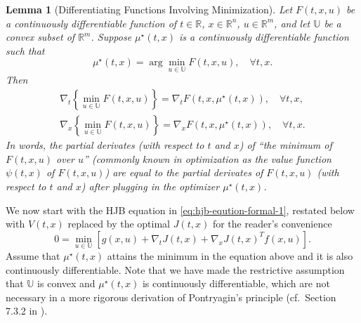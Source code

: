 \documentclass[
]{book}
\newtheorem{lemma}{Lemma}[chapter]
\theoremstyle{definition}
\theoremstyle{definition}
\theoremstyle{definition}
\theoremstyle{definition}
\theoremstyle{remark}
\begin{document}
\begin{lemma}[Differentiating Functions Involving Minimization]
\protect\hypertarget{lem:gradientofminimumfunctions}{}\label{lem:gradientofminimumfunctions}Let \(F(t,x,u)\) be a continuously differentiable function of \(t \in \mathbb{R}\), \(x \in \mathbb{R}^n\), \(u \in \mathbb{R}^m\), and let \(\mathbb{U}\) be a convex subset of \(\mathbb{R}^m\). Suppose \(\mu^\star(t,x)\) is a continuously differentiable function such that
\[
\mu^\star(t,x) = \arg\min_{u \in \mathbb{U}} F(t,x,u), \quad \forall t,x.
\]
Then
\begin{align}
\nabla_t \left\{ \min_{u \in \mathbb{U}} F(t,x,u) \right\} = \nabla_t F(t,x,\mu^\star(t,x)), \quad \forall t,x, \\
\nabla_x \left\{ \min_{u \in \mathbb{U}} F(t,x,u) \right\} = \nabla_x F(t,x,\mu^\star(t,x)), \quad \forall t,x.
\end{align}
In words, the partial derivates (with respect to \(t\) and \(x\)) of ``the minimum of \(F(t,x,u)\) over \(u\)'' (commonly known in optimization as the value function \(\psi(t,x)\) of \(F(t,x,u)\)) are equal to the partial derivates of \(F(t,x,u)\) (with respect to \(t\) and \(x\)) after plugging in the optimizer \(\mu^\star(t,x)\).
\end{lemma}

We now start with the HJB equation in \eqref{eq:hjb-eqution-formal-1}, restated below with \(V(t,x)\) replaced by the optimal \(J(t,x)\) for the reader's convenience
\begin{equation}
0 = \min_{u \in \mathbb{U}} \left[ g(x,u) + \nabla_t J(t,x) + \nabla_x J(t,x)^Tf(x,u)  \right].
\label{eq:hjb-equation-restate-for-pmp}
\end{equation}
Assume that \(\mu^\star(t,x)\) attains the minimum in the equation above and it is also continuously differentiable. Note that we have made the restrictive assumption that \(\mathbb{U}\) is convex and \(\mu^\star(t,x)\) is continuously differentiable, which are not necessary in a more rigorous derivation of Pontryagin's principle (cf.~Section 7.3.2 in \citep{bertsekas12book-dpocI}).
\end{document}

